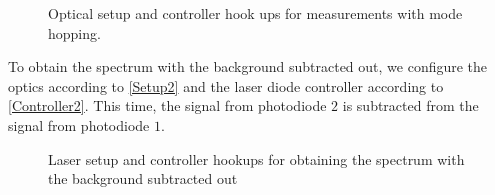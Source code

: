 \documentclass[12pt]{article}
\begin{document}
	\begin{figure}[H]
		\centering
		\qquad
		\caption{Optical setup and controller hook ups for measurements with mode hopping.}
		\label{Controller1}		
	\end{figure}
	
	To obtain the spectrum with the background subtracted out, we configure the optics according to \cref{Setup2} and the laser diode controller according to \cref{Controller2}. This time, the signal from photodiode $2$ is subtracted from the signal from photodiode $1$.
	
	\begin{figure}[H]
		\centering
		\qquad
		\caption{Laser setup and controller hookups for obtaining the spectrum with the background subtracted out}
	\end{figure}
\end{document}
